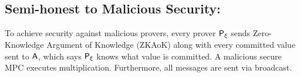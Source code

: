 \begin{comment}
\begin{align}\label{eq:commiteq}
d_0 + \sum_{a=1}^{s+\ell}\mu_ac_a &= \comm(z,\nu) \nonumber \\
c_0 + \sum_{a=1}^{s+\ell}\varphi_ac_a &= \comm(z',\omega) \nonumber \\
\sum_{a=1}^{s+\ell}T[a,k_u]c_a &= \comm(P[\cdot,k_u],\chi_u) \text{ for } u\in [t] \nonumber \\
\sum_{a=1}^{\ell}\mc{T}[a,k_u]\tilde{c}_a &= \comm\big(\sum_{i\in
[p]}\tilde{U}[\cdot,k_u],\tilde{O}[\cdot, k_u]\big) \text{ for } u\in [t] \nonumber \\
\beta\tilde{d}_0 + \sum_{a=1}^{\ell}\tilde{\mu}_a\tilde{c}_a &=
\comm(\tilde{z},\tilde{\nu})
\end{align} 

\end{proof}
\end{comment}
\subsection{Semi-honest to Malicious Security: }\label{app:semi-honesttomalicious} 
To achieve security against malicious provers, every prover $\mathsf{P}_\xi$ sends Zero-Knowledge Argument of Knowledge (ZKAoK) along with every committed value sent to $\mathsf{A}$, which says $\mathsf{P}_\xi$ knows what value is committed. A malicious secure MPC executes multiplication. Furthermore, all messages are sent via broadcast.

